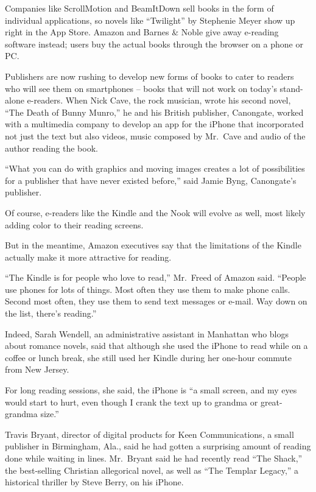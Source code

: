 ﻿\documentclass[12pt]{article}
\begin{document}
Companies like ScrollMotion and BeamItDown sell books in the form of individual applications, so
novels like ``Twilight'' by Stephenie Meyer show up right in the App Store. Amazon and Barnes \&
Noble give away e-reading software instead; users buy the actual books through the browser on a
phone or PC.

Publishers are now rushing to develop new forms of books to cater to readers who will see them on
smartphones -- books that will not work on today's stand-alone e-readers. When Nick Cave, the rock
musician, wrote his second novel, ``The Death of Bunny Munro,'' he and his British publisher,
Canongate, worked with a multimedia company to develop an app for the iPhone that incorporated not
just the text but also videos, music composed by Mr.~Cave and audio of the author reading the book.

``What you can do with graphics and moving images creates a lot of possibilities for a publisher
that have never existed before,'' said Jamie Byng, Canongate's publisher.

Of course, e-readers like the Kindle and the Nook will evolve as well, most likely adding color to
their reading screens.

But in the meantime, Amazon executives say that the limitations of the Kindle actually make it more
attractive for reading.

``The Kindle is for people who love to read,'' Mr.~Freed of Amazon said. ``People use phones for
lots of things. Most often they use them to make phone calls. Second most often, they use them to
send text messages or e-mail. Way down on the list, there's reading.''

Indeed, Sarah Wendell, an administrative assistant in Manhattan who blogs about romance novels, said
that although she used the iPhone to read while on a coffee or lunch break, she still used her
Kindle during her one-hour commute from New Jersey.

For long reading sessions, she said, the iPhone is ``a small screen, and my eyes would start to
hurt, even though I crank the text up to grandma or great-grandma size.''

Travis Bryant, director of digital products for Keen Communications, a small publisher in
Birmingham, Ala., said he had gotten a surprising amount of reading done while waiting in lines.
Mr.~Bryant said he had recently read ``The Shack,'' the best-selling Christian allegorical novel, as
well as ``The Templar Legacy,'' a historical thriller by Steve Berry, on his iPhone.
\end{document}
